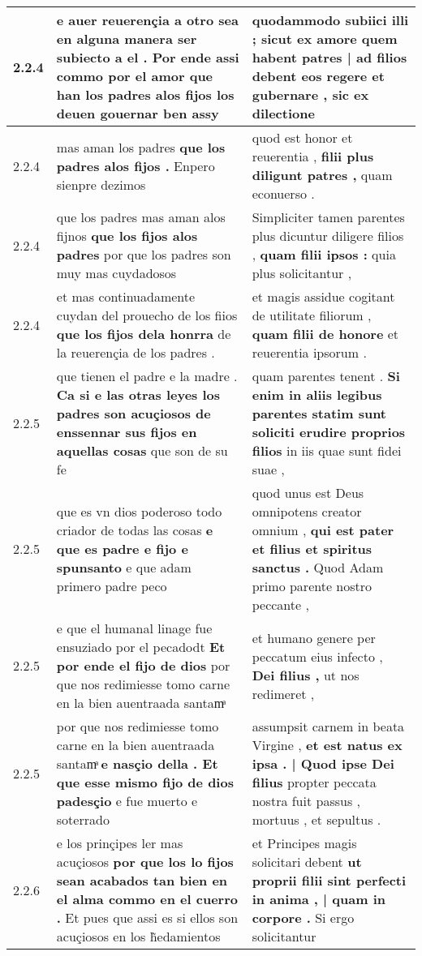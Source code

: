 \begin{tabular}{|p{1cm}|p{6.5cm}|p{6.5cm}|}
2.2.4 & e auer reuerençia a otro sea en alguna manera ser subiecto a el . \textbf{ Por ende assi commo por el amor que han los padres alos fijos los deuen gouernar ben } assy & quodammodo subiici illi ; \textbf{ sicut ex amore quem habent patres | ad filios debent eos regere et gubernare , } sic ex dilectione \\\hline
2.2.4 & mas aman los padres \textbf{ que los padres alos fijos . } Enpero sienpre dezimos & quod est honor et reuerentia , \textbf{ filii plus diligunt patres , } quam econuerso . \\\hline
2.2.4 & que los padres mas aman alos fijnos \textbf{ que los fijos alos padres } por que los padres son muy mas cuydadosos & Simpliciter tamen parentes plus dicuntur diligere filios , \textbf{ quam filii ipsos : } quia plus solicitantur , \\\hline
2.2.4 & et mas continuadamente cuydan del prouecho de los fiios \textbf{ que los fijos dela honrra } de la reuerençia de los padres . & et magis assidue cogitant de utilitate filiorum , \textbf{ quam filii de honore } et reuerentia ipsorum . \\\hline
2.2.5 & que tienen el padre e la madre . \textbf{ Ca si e las otras leyes los padres son acuçiosos de enssennar sus fijos en aquellas cosas } que son de su fe & quam parentes tenent . \textbf{ Si enim in aliis legibus parentes statim sunt soliciti erudire proprios filios } in iis quae sunt fidei suae , \\\hline
2.2.5 & que es vn dios poderoso todo criador de todas las cosas \textbf{ e que es padre e fijo e spunsanto } e que adam primero padre peco & quod unus est Deus omnipotens creator omnium , \textbf{ qui est pater et filius et spiritus sanctus . } Quod Adam primo parente nostro peccante , \\\hline
2.2.5 & e que el humanal linage fue ensuziado por el pecadodt \textbf{ Et por ende el fijo de dios } por que nos redimiesse tomo carne en la bien auentraada santamͣ & et humano genere per peccatum eius infecto , \textbf{ Dei filius , } ut nos redimeret , \\\hline
2.2.5 & por que nos redimiesse tomo carne en la bien auentraada santamͣ \textbf{ e nasçio della . Et que esse mismo fijo de dios padesçio } e fue muerto e soterrado & assumpsit carnem in beata Virgine , \textbf{ et est natus ex ipsa . | Quod ipse Dei filius } propter peccata nostra fuit passus , mortuus , et sepultus . \\\hline
2.2.6 & e los prinçipes ler mas acuçiosos \textbf{ por que los lo fijos sean acabados tan bien en el alma commo en el cuerro . } Et pues que assi es si ellos son acuçiosos en los h̃edamientos & et Principes magis solicitari debent \textbf{ ut proprii filii sint perfecti in anima , | quam in corpore . } Si ergo solicitantur \\\hline

\end{tabular}
